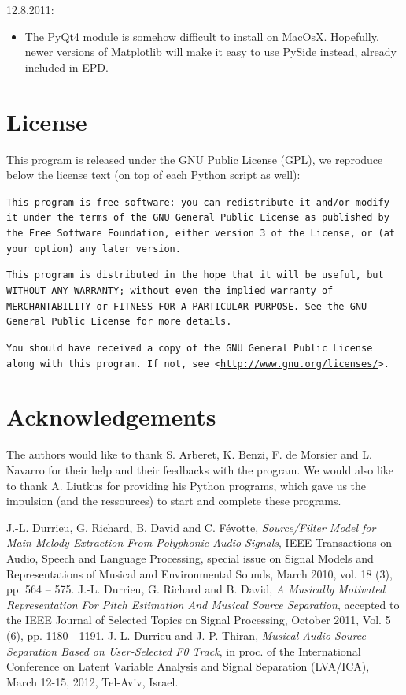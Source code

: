\documentclass{article}
\begin{document}
12.8.2011:
\begin{itemize}
\item The PyQt4 module is somehow difficult to install on MacOsX. Hopefully, newer versions of Matplotlib will make it easy to use PySide instead, already included in EPD. 
\end{itemize}

\section{License}
This program is released under the GNU Public License (GPL), we reproduce 
below the license text (on top of each Python script as well):

\texttt{This program is free software: you can redistribute it and/or modify it under the terms of the GNU General Public License as published by the Free Software Foundation, either version 3 of the License, or (at your option) any later version.}

\texttt{This program is distributed in the hope that it will be useful, but WITHOUT ANY WARRANTY; without even the implied warranty of MERCHANTABILITY or FITNESS FOR A PARTICULAR PURPOSE.  See the GNU General Public License for more details.}

\texttt{You should have received a copy of the GNU General Public License along with this program.  If not, see <\url{http://www.gnu.org/licenses/}>.}

\section*{Acknowledgements}
The authors would like to thank S. Arberet, K. Benzi, F. de Morsier and L. Navarro for their help and their feedbacks with the program. We would also like to thank A. Liutkus for providing his Python programs, which gave us the impulsion (and the ressources) to start and complete these programs.

\begin{thebibliography}{99}

J.-L. Durrieu, G. Richard, B. David and C. F\'evotte, \emph{Source/Filter Model for Main Melody Extraction From Polyphonic Audio Signals}, IEEE Transactions on Audio, Speech and Language Processing, 
special issue on Signal Models and Representations of Musical and 
Environmental Sounds, March 2010, vol. 18 (3), pp. 564 -- 575.
 J.-L. Durrieu, G. Richard and B. David, \emph{A Musically Motivated Representation For Pitch Estimation 
And Musical Source Separation}, accepted to the IEEE Journal of Selected Topics on Signal Processing, October 2011, Vol. 5 (6), pp. 1180 - 1191.
 J.-L. Durrieu and J.-P. Thiran, \emph{Musical Audio Source Separation Based on User-Selected F0 Track}, in proc. of the International Conference on Latent Variable Analysis and Signal Separation (LVA/ICA), March 12-15, 2012, Tel-Aviv, Israel. 
\end{thebibliography}
\end{document}
